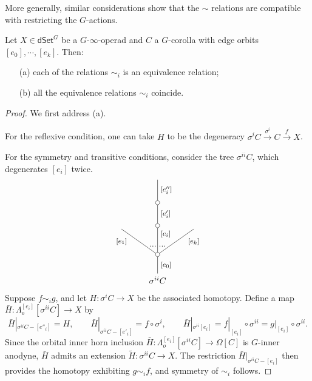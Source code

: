 \documentclass[a4paper,10pt
,draft
]{article}%
\renewcommand{\1}{\eta}%
\begin{document}
\begin{example}
More generally, similar considerations show that the $\sim$ relations are compatible with restricting the $G$-actions.
\end{example}


\begin{lemma}\label{EQUIVI LEM}
	Let $X \in \mathsf{dSet}^G$ be a $G$-$\infty$-operad and $C$ a $G$-corolla with edge orbits
	$[e_0],\cdots,[e_k]$. Then:
\begin{itemize}
	\item[(a)] each of the relations $\sim_i$ is an equivalence relation;
	\item[(b)] all the equivalence relations $\sim_i$ coincide.
\end{itemize}
\end{lemma}

\begin{proof}
	We first address (a). 
	
	For the reflexive condition, one can take $H$ to be the degeneracy
	$\sigma^i C \xrightarrow{\sigma^i} C \xrightarrow{f} X$.
	
	For the symmetry and transitive conditions, consider the tree
	$\sigma^{ii} C$, which degenerates $[e_i]$ twice.
\[
\begin{tikzpicture}
[grow=up,auto,level distance=3em,
every node/.style = {font=\footnotesize},
dummy/.style={circle,draw,inner sep=0pt,minimum size=1.75mm}]
	\node at (0,0) [font=\normalsize]{$\sigma^{ii} C$}
		child{node [dummy] {}
			child{
			edge from parent node [swap,near end] {$[e_k]$} node [near start,inner sep=1pt,name=Kn] {}}
			child[level distance=3.4em]{node [dummy] {}
				child[level distance=2.7em]{node [dummy] {}
					child[level distance=2.7em]{
					edge from parent node [swap] {$[e''_i]$}
}
				edge from parent node [swap] {$[e'_i]$}
}
			edge from parent node [near end,swap] {$[e_i]$}
node [near start,inner sep=1pt,name=Kone,swap] {}
node [near start,inner sep=1pt,name=Kone1] {}}
			child{
			edge from parent node [near end] {$[e_1]$}
node [swap] {}
node [near start,inner sep=1pt,name=Kn1,swap]{}}
		edge from parent node [swap] {$[e_0]$}
		};
		\draw [dotted,thick] (Kone) -- (Kn) ;
		\draw [dotted,thick] (Kone1) -- (Kn1) ;
\end{tikzpicture}
\]
Suppose $f \sim_i g$, and let 
$H \colon \sigma^{i} C \to X$ be the associated homotopy.
Define a map 
$\bar{H} \colon \Lambda^{[e_i]}_o[\sigma^{ii} C] \to X$ by
\[
	\bar{H}|_{\sigma^{ii}C - [e''_i]} = H,
		\qquad
	\bar{H}|_{\sigma^{ii}C - [e'_i]} = f \circ \sigma^i,
		\qquad
	\bar{H}|_{\sigma^{ii} [e_i]} = 
	f|_{[e_i]} \circ \sigma^{ii} =
	g|_{[e_i]} \circ \sigma^{ii}.
\]
Since the orbital inner horn inclusion
$\bar{H} \colon \Lambda^{[e_i]}_o[\sigma^{ii} C] \to \Omega[C]$
is $G$-inner anodyne,
$\bar{H}$ admits an extension $\widetilde{H} \colon \sigma^{ii}C \to X$.
The restriction $\bar{H}|_{\sigma^{ii}C - [e_i]}$ then provides the homotopy exhibiting $g \sim_i f$, and symmetry of $\sim_i$ follows.


\end{proof}
\end{document}

